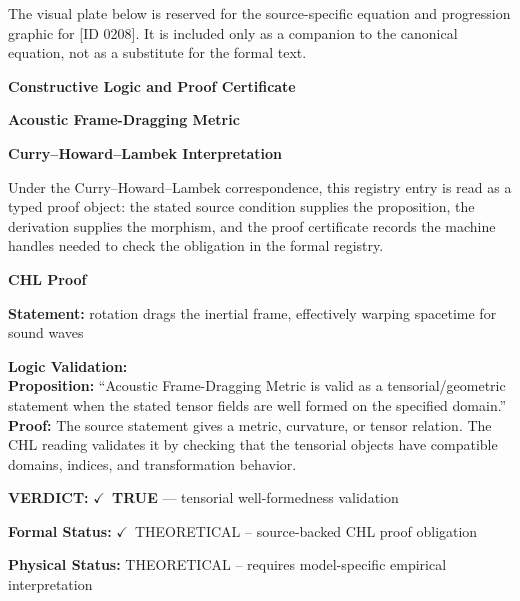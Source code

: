 \begingroup\footnotesize\sloppy
The visual plate below is reserved for the source-specific equation and progression graphic for [ID 0208]. It is included only as a companion to the canonical equation, not as a substitute for the formal text.
\par\endgroup
\ifTZPDarkEdition
{}
\fi

\clearpage
\begingroup\tzpsupportsetup
\noindent\textbf{\fontsize{10.8pt}{12.8pt}\selectfont [ID 0208] Constructive Logic and Proof Certificate}\par
\noindent\textbf{\fontsize{10pt}{12pt}\selectfont Acoustic Frame-Dragging Metric}\par
\vspace{0.45em}
\begingroup
\footnotesize
\setlength{\parskip}{0.22em}
\setlength{\parindent}{0pt}
\noindent\textbf{Curry--Howard--Lambek Interpretation}\par
Under the Curry--Howard--Lambek correspondence, this registry entry is read as a typed proof
object: the stated source condition supplies the proposition, the derivation supplies the
morphism, and the proof certificate records the machine handles needed to check the obligation
in the formal registry.

\vspace{0.45em}
\noindent\textbf{CHL Proof}\par
\textbf{Statement:} rotation drags the inertial frame, effectively warping spacetime for sound waves

\textbf{Logic Validation:}\\
\textbf{Proposition:} ``Acoustic Frame-Dragging Metric is valid as a tensorial/geometric statement when the
stated tensor fields are well formed on the specified domain.''\\
\textbf{Proof:} The source statement gives a metric, curvature, or tensor relation. The CHL reading
validates it by checking that the tensorial objects have compatible domains, indices,
and transformation behavior.

\textbf{VERDICT:} \ensuremath{\checkmark}\ \textbf{TRUE} --- tensorial well-formedness validation

\textbf{Formal Status:} \ensuremath{\checkmark}\ THEORETICAL -- source-backed CHL proof obligation

\textbf{Physical Status:} THEORETICAL -- requires model-specific empirical interpretation
\par\vspace{0.45em}
\par
\ifTZPDarkEdition
{}
\fi
\endgroup
\endgroup
